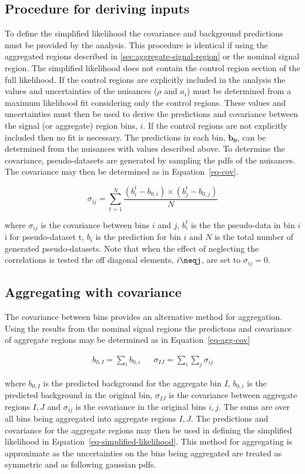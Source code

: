 \subsection{Procedure for deriving inputs}

To define the simplified likelihood the covariance and background predictions must be 
provided by the analysis. This procedure is identical if using the 
aggregated regions described in \ref{sec:aggregate-signal-region} or the nominal signal region. 
The simplified likelihood does not contain the control region 
section of the full likelihood. If the control regions are explicitly included in the analysis
the values and uncertainties of the nuisances ($\rho$ and $a_i$)
must be determined from a maximum likelihood fit considering only the control regions.
These values and uncertainties must then be used to derive the predictions and covariance
between the signal (or aggregate) region bins, $i$. If the control regions are not explicitly 
included then no fit is necessary. The predictions in each bin, $\mathbf{b_0}$, can be 
determined from the nuisances with values described above. To determine the covariance, pseudo-datasets are generated
by sampling the pdfs of the nuisances. The covariance may then be determined as in Equation~\ref{eq-cov}.

\begin{equation}
\sigma_{ij}=\sum^N_{t=1}{\frac{(b^t_i-b_{0,i})\times(b^t_j-b_{0,j})}{N}}
\label{eq-cov}
\end{equation}

where $\sigma_{ij}$ is the covariance between bins $i$ and $j$, $b^t_i$ is the
the pseudo-data in bin $i$i for pseudo-dataset t, 
$b_i$ is the prediction for bin $i$ and $N$ is the total number of generated pseudo-datasets.
Note that when the effect of neglecting the correlations is tested the off diagonal 
elements, $i\neqj$, are set to $\sigma_{ij} = 0$.


\subsection{Aggregating with covariance}

The covariance between bins provides an alternative method for aggregation. 
Using the results from the nominal signal regions the predictons and covariance of aggregate regions
may be determined as in Equation~\ref{eq-agg-cov}

\begin{align}
b_{0,I} = \sum_i b_{0,i} && \sigma_{IJ}=\sum_i\sum_j\sigma_{ij}
\label{eq-agg-cov}
\end{align}

where $b_{0,I}$ is the predicted background for the aggregate bin $I$,
$b_{0,i}$ is the predicted background in the original bin, $\sigma_{IJ}$
is the covariance between aggregate regions $I,J$ and $\sigma_{ij}$ is
the covariance in the original bins $i,j$. The sums are over all
bins being aggregated into aggregate regions $I,J$. The predictions
and covariance for the aggregate regions may then be used in defining 
the simplified likelihood in Equation~\ref{eq-simplified-likelihood}.
This method for aggregating is approximate as the uncertainties
on the bins being aggregated are treated as symmetric and as following
gaussian pdfs.
